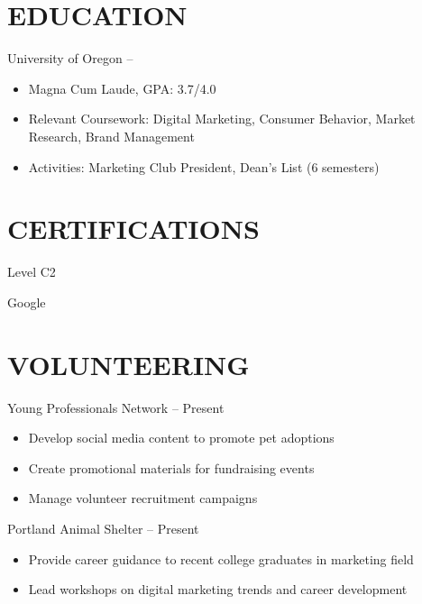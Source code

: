 \documentclass{resumeclass}
\begin{document}
\section{EDUCATION}

    {University of Oregon}
    { -- }
    {\begin{itemize}
        \item Magna Cum Laude, GPA: 3.7/4.0
        \item Relevant Coursework: Digital Marketing, Consumer Behavior, Market Research, Brand Management
        \item Activities: Marketing Club President, Dean's List (6 semesters)
    \end{itemize}}

\section{CERTIFICATIONS}

    {Level C2}
    {}
    {}

    {Google}
    {}
    {}

\section{VOLUNTEERING}

    {Young Professionals Network}
    { -- Present}
    {\begin{itemize}
        \item Develop social media content to promote pet adoptions
        \item Create promotional materials for fundraising events
        \item Manage volunteer recruitment campaigns
    \end{itemize}}

    {Portland Animal Shelter}
    { -- Present}
    {\begin{itemize}
        \item Provide career guidance to recent college graduates in marketing field
        \item Lead workshops on digital marketing trends and career development
    \end{itemize}}
\end{document}
